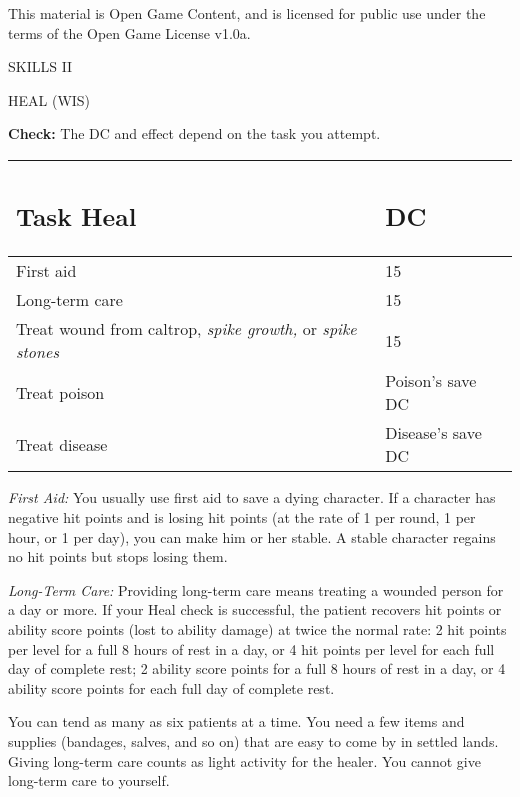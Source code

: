 \documentclass{article}
\begin{document}
This material is Open Game Content, and is licensed for public use under the terms 
of the Open Game License v1.0a.

{\LARGE{}SKILLS II}

\vspace{12pt}
HEAL (WIS)

\textbf{Check:} The DC and effect depend on the task you attempt.

\vspace{12pt}
\begin{tabular}{|>{\raggedright}p{119pt}|>{\raggedright}p{78pt}|}
\hline
\subsection*{T\textbf{ask Heal }} & \subsection*{D\textbf{C}}\tabularnewline
\hline
First aid & 15\tabularnewline
\hline
Long-term care  & 15\tabularnewline
\hline
Treat wound from caltrop, \textit{spike growth, }or \textit{spike stones } & 15\tabularnewline
\hline
Treat poison  & Poison's save DC\tabularnewline
\hline
Treat disease  & Disease's save DC\tabularnewline
\hline
\end{tabular}

\vspace{12pt}
\textit{First Aid: }You usually use first aid to save a dying character. If a character 
has negative hit points and is losing hit points (at the rate of 1 per round, 1 
per hour, or 1 per day), you can make him or her stable. A stable character regains 
no hit points but stops losing them.

\textit{Long-Term Care: }Providing long-term care means treating a wounded person 
for a day or more. If your Heal check is successful, the patient recovers hit points 
or ability score points (lost to ability damage) at twice the normal rate: 2 hit 
points per level for a full 8 hours of rest in a day, or 4 hit points per level 
for each full day of complete rest; 2 ability score points for a full 8 hours of 
rest in a day, or 4 ability score points for each full day of complete rest.

You can tend as many as six patients at a time. You need a few items and supplies 
(bandages, salves, and so on) that are easy to come by in settled lands. Giving 
long-term care counts as light activity for the healer. You cannot give long-term 
care to yourself.
\end{document}
